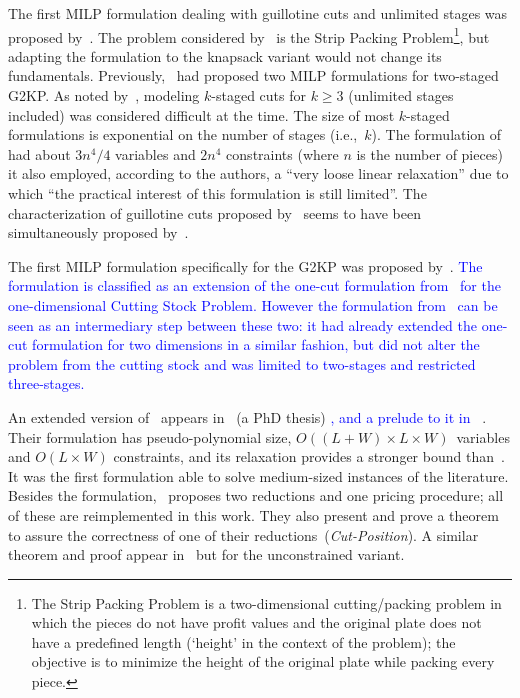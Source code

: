 \documentclass[ppgc,tese,english,formais,babel]{iiufrgs}
\newif\iffinalversion
\newcommand{\newtext}[1]{\iffinalversion%
#1%
\else%
\textcolor{blue}{#1}%
\fi%
}
\begin{document}
The first MILP formulation dealing with guillotine cuts and unlimited stages was proposed by~\citet{messaoud:2008}.
The problem considered by~\citet{messaoud:2008} is the Strip Packing Problem\footnote{The Strip Packing Problem is a two-dimensional cutting/packing problem in which the pieces do not have profit values and the original plate does not have a predefined length (`height' in the context of the problem); the objective is to minimize the height of the original plate while packing every piece.}, but adapting the formulation to the knapsack variant would not change its fundamentals.
Previously, \citet{lodi:2003}~had proposed two MILP formulations for two-staged G2KP.
As noted by~\citet{belov_thesis:2003}, modeling \(k\)-staged cuts for \(k \geq 3\) (unlimited stages included) was considered difficult at the time.
The size of most \(k\)-staged formulations is exponential on the number of stages (i.e.,~\(k\)).
The formulation of~\citet{messaoud:2008} had about \(3n^4/4\) variables and \(2n^4\) constraints (where \(n\) is the number of pieces) it also employed, according to the authors, a ``very loose linear relaxation'' due to which ``the practical interest of this formulation is still limited''.
The characterization of guillotine cuts proposed by~\citet{messaoud:2008} seems to have been simultaneously proposed by~\citet{pisinger:2007}. %

The first MILP formulation specifically for the G2KP was proposed by~\citet{furini:2016}.
\newtext{The formulation is classified as an extension of the one-cut formulation from~\citet{dyckhoff:1981} for the one-dimensional Cutting Stock Problem.
However the formulation from~\citet{silva:2010} can be seen as an intermediary step between these two: it had already extended the one-cut formulation for two dimensions in a similar fashion, but did not alter the problem from the cutting stock and was limited to two-stages and restricted three-stages.}
An extended version of~\citet{furini:2016} appears in~\citet{dimitri_thesis} (a PhD thesis)\newtext{, and a prelude to it in~\citet{furini:conference:2016}}.
Their formulation has pseudo-polynomial size, \(O((L + W) \times L \times W)\)~variables and \(O(L \times W)\) constraints, and its relaxation provides a stronger bound than~\citet{messaoud:2008}.
It was the first formulation able to solve medium-sized instances of the literature.
Besides the formulation, \citet{furini:2016}~proposes two reductions and one pricing procedure; all of these are reimplemented in this work.
They also present and prove a theorem to assure the correctness of one of their reductions~(\emph{Cut-Position}).
A similar theorem and proof appear in~\citet{song:2010} but for the unconstrained variant.
\end{document}
